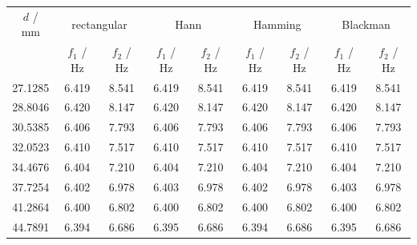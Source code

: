 \begin{tabular}{@{}ccccccccc@{}}
\toprule
$d$ / mm & \multicolumn{2}{c}{rectangular} & \multicolumn{2}{c}{Hann} & \multicolumn{2}{c}{Hamming} & \multicolumn{2}{c}{Blackman} \\
 & $f_1$ / Hz & $f_2$ / Hz & $f_1$ / Hz & $f_2$ / Hz & $f_1$ / Hz & $f_2$ / Hz & $f_1$ / Hz & $f_2$ / Hz \\
\midrule
27.1285 & 6.419 & 8.541 & 6.419 & 8.541 & 6.419 & 8.541 & 6.419 & 8.541 \\
28.8046 & 6.420 & 8.147 & 6.420 & 8.147 & 6.420 & 8.147 & 6.420 & 8.147 \\
30.5385 & 6.406 & 7.793 & 6.406 & 7.793 & 6.406 & 7.793 & 6.406 & 7.793 \\
32.0523 & 6.410 & 7.517 & 6.410 & 7.517 & 6.410 & 7.517 & 6.410 & 7.517 \\
34.4676 & 6.404 & 7.210 & 6.404 & 7.210 & 6.404 & 7.210 & 6.404 & 7.210 \\
37.7254 & 6.402 & 6.978 & 6.403 & 6.978 & 6.402 & 6.978 & 6.403 & 6.978 \\
41.2864 & 6.400 & 6.802 & 6.400 & 6.802 & 6.400 & 6.802 & 6.400 & 6.802 \\
44.7891 & 6.394 & 6.686 & 6.395 & 6.686 & 6.394 & 6.686 & 6.395 & 6.686 \\
\bottomrule
\end{tabular}